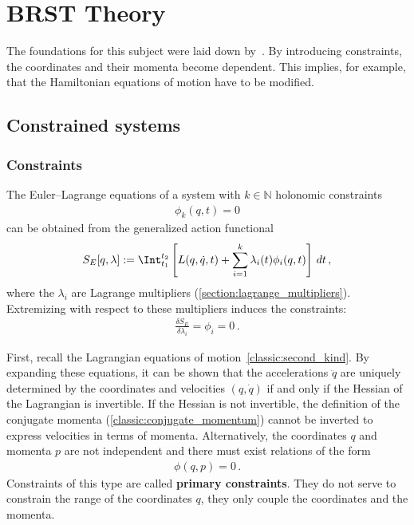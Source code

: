 \chapter{BRST Theory}\label{chapter:constrained_dynamics}

    The foundations for this subject were laid down by~\citet{dirac_generalized_1950}. By introducing constraints, the coordinates and their momenta become dependent. This implies, for example, that the Hamiltonian equations of motion have to be modified.

    \minitoc

\section{Constrained systems}\label{section:constrained_systems}
\subsection{Constraints}

    \begin{method}
        The Euler--Lagrange equations of a system with $k\in\mathbb{N}$ holonomic constraints
        \begin{gather}
            \phi_k(q,t)=0
        \end{gather}
        can be obtained from the generalized action functional
        \begin{gather}
            S_E[q,\lambda]:=\Int_{t_1}^{t_2}\left[L(q,\dot{q},t) + \sum_{i=1}^k\lambda_i(t)\phi_i(q,t)\right]\,dt\,,
        \end{gather}
        where the $\lambda_i$ are Lagrange multipliers (\cref{section:lagrange_multipliers}). Extremizing with respect to these multipliers induces the constraints:
        \begin{gather}
            \frac{\delta S_E}{\delta\lambda_i}=\phi_i=0\,.
        \end{gather}
    \end{method}

    First, recall the Lagrangian equations of motion~\eqref{classic:second_kind}. By expanding these equations, it can be shown that the accelerations $\ddot{q}$ are uniquely determined by the coordinates and velocities $(q,\dot{q})$ if and only if the Hessian of the Lagrangian is invertible. If the Hessian is not invertible, the definition of the conjugate momenta (\cref{classic:conjugate_momentum}) cannot be inverted to express velocities in terms of momenta. Alternatively, the coordinates $q$ and momenta $p$ are not independent and there must exist relations of the form
    \begin{gather}
        \phi(q,p) = 0\,.
    \end{gather}
    Constraints of this type are called \textbf{primary constraints}. They do not serve to constrain the range of the coordinates $q$, they only couple the coordinates and the momenta.

